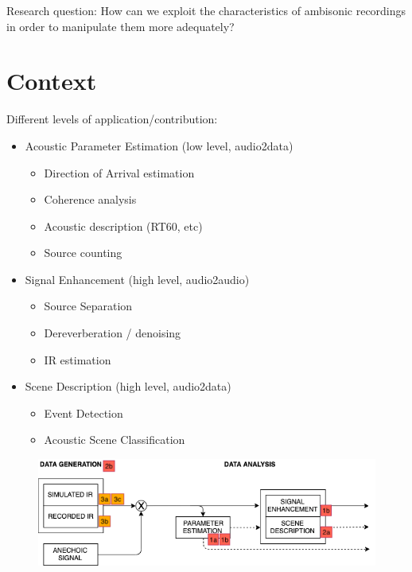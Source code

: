 Research question: 	How can we exploit the characteristics of ambisonic recordings in order to manipulate them more adequately? 


\section{Context}

Different levels of application/contribution:

\begin{itemize}
	\item Acoustic Parameter Estimation (low level, audio2data)
	\begin{itemize}
		\item Direction of Arrival estimation
		\item Coherence analysis
		\item Acoustic description (RT60, etc)
		\item Source counting
	\end{itemize}

	\item Signal Enhancement  (high level, audio2audio)
	\begin{itemize}
		\item Source Separation
		\item Dereverberation / denoising
		\item IR estimation
	\end{itemize}

	\item Scene Description (high level, audio2data)
	\begin{itemize}
		\item Event Detection
		\item Acoustic Scene Classification
	\end{itemize}
\end{itemize}

\begin{figure}[hbt]
  \includegraphics[width=\textwidth]{Figures/Introduction/context_scheme.png}
  \caption{}
\end{figure}


